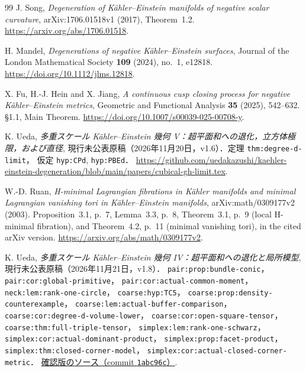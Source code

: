 \begin{thebibliography}{99}
J. Song,
\emph{Degeneration of Kähler--Einstein manifolds of negative scalar curvature},
arXiv:1706.01518v1 (2017), Theorem~1.2.
\url{https://arxiv.org/abs/1706.01518}.

H. Mandel,
\emph{Degenerations of negative Kähler--Einstein surfaces},
Journal of the London Mathematical Society \textbf{109} (2024), no.~1, e12818.
\url{https://doi.org/10.1112/jlms.12818}.

X. Fu, H.-J. Hein and X. Jiang,
\emph{A continuous cusp closing process for negative Kähler--Einstein metrics},
Geometric and Functional Analysis \textbf{35} (2025), 542--632.
\S1.1, Main Theorem.
\url{https://doi.org/10.1007/s00039-025-00708-y}.

K. Ueda,
\emph{多重スケール Kähler--Einstein 幾何 V：超平面和への退化，立方体極限，および直径},
現行未公表原稿（2026年11月20日，v1.6）．定理 \texttt{thm:degree-d-limit}，
仮定 \texttt{hyp:CPd}, \texttt{hyp:PBEd}．
\url{https://github.com/uedakazushi/kaehler-einstein-degeneration/blob/main/papers/cubical-gh-limit.tex}.

W.-D. Ruan,
\emph{H-minimal Lagrangian fibrations in Kähler manifolds and minimal
Lagrangian vanishing tori in Kähler--Einstein manifolds},
arXiv:math/0309177v2 (2003).
Proposition~3.1, p.~7, Lemma~3.3, p.~8,
Theorem~3.1, p.~9 (local H-minimal fibration),
and Theorem~4.2, p.~11 (minimal vanishing tori), in the cited arXiv version.
\url{https://arxiv.org/abs/math/0309177v2}.

K. Ueda,
\emph{多重スケール Kähler--Einstein 幾何 IV：超平面和への退化と局所模型},
現行未公表原稿（2026年11月21日，v1.8）．
\texttt{pair:prop:bundle-conic}，\texttt{pair:cor:global-primitive}，
\texttt{pair:cor:actual-common-moment}，\texttt{neck:lem:rank-one-circle}，
\texttt{coarse:hyp:TC5}，
\texttt{coarse:prop:density-counterexample}，
\texttt{coarse:lem:actual-buffer-comparison}，
\texttt{coarse:cor:degree-d-volume-lower}，
\texttt{coarse:cor:open-square-tensor}，
\texttt{coarse:thm:full-triple-tensor}，
\texttt{simplex:lem:rank-one-schwarz}，
\texttt{simplex:cor:actual-dominant-product}，
\texttt{simplex:prop:facet-product}，
\texttt{simplex:thm:closed-corner-model}，
\texttt{simplex:cor:actual-closed-corner-metric}．
\href{https://github.com/uedakazushi/kaehler-einstein-degeneration/blob/1abc96cea3d9c369410e0e9d2a57414276e7c776/papers/kaehler-einstein-degeneration.tex}{確認版のソース（commit \texttt{1abc96c}）}.


\end{thebibliography}
